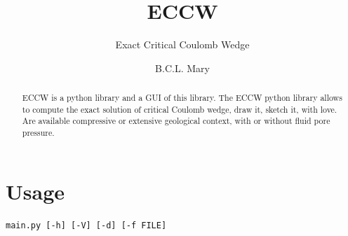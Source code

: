 \documentclass[a4paper]{scrartcl}
\title{ECCW}
\subtitle{Exact Critical Coulomb Wedge}
\author{B.C.L. Mary}
\begin{document}
\maketitle %

\begin{abstract}

ECCW is a python library and a GUI of this library.
The ECCW python library allows to compute the exact solution of critical Coulomb wedge, draw it, sketch it, with love.
Are available compressive or extensive geological context, with or without fluid pore pressure.

\end{abstract}

\setcounter{tocdepth}{2}
\tableofcontents

\newpage
\section{Usage}

\begin{lstlisting} 
main.py [-h] [-V] [-d] [-f FILE]
\end{lstlisting}
\end{document}
